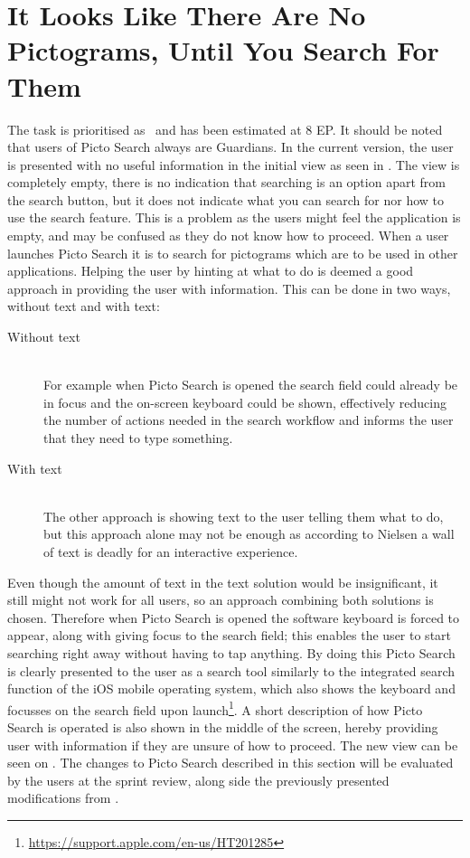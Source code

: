 \section{It Looks Like There Are No Pictograms, Until You Search For Them}\label{untilSearch}

The task is prioritised as \phigh~and has been estimated at 8 EP.  
It should be noted that users of Picto Search always are Guardians.
In the current version, the user is presented with no useful information in the initial view as seen in . 
The view is completely empty, there is no indication that searching is an option apart from the search button, but it does not indicate what you can search for nor how to use the search feature.
This is a problem as the users might feel the application is empty, and may be confused as they do not know how to proceed.
When a user launches Picto Search it is to search for pictograms which are to be used in other applications.
Helping the user by hinting at what to do is deemed a good approach in providing the user with information.
This can be done in two ways, without text and with text:
\begin{description}
    \item [Without text] \hfill\\
    For example when Picto Search is opened the search field could already be in focus and the on-screen keyboard could be shown, effectively reducing the number of actions needed in the search workflow and informs the user that they need to type something.
    \item [With text] \hfill\\
    The other approach is showing text to the user telling them what to do, but this approach alone may not be enough as according to Nielsen \cite{nielsen2003usability} a wall of text is deadly for an interactive experience.
\end{description}

Even though the amount of text in the text solution would be insignificant, it still might not work for all users, so an approach combining both solutions is chosen.
Therefore when Picto Search is opened the software keyboard is forced to appear, along with giving focus to the search field; this enables the user to start searching right away without having to tap anything.
By doing this Picto Search is clearly presented to the user as a search tool similarly to the integrated search function of the iOS mobile operating system, which also shows the keyboard and focusses on the search field upon launch\footnote{\url{https://support.apple.com/en-us/HT201285}}.               
A short description of how Picto Search is operated is also shown in the middle of the screen, hereby providing user with information if they are unsure of how to proceed.
The new view can be seen on .
The changes to Picto Search described in this section will be evaluated by the users at the sprint review, along side the previously presented modifications from .